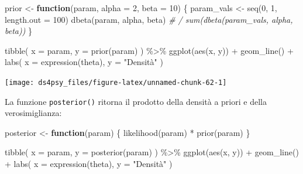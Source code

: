 \documentclass[
  11pt,
]{krantz}
\makeatletter
\newenvironment{Shaded}{\begin{snugshade}}{\end{snugshade}}
\newcommand{\AttributeTok}[1]{\textcolor[rgb]{0.61,0.61,0.61}{#1}}
\newcommand{\CommentTok}[1]{\textcolor[rgb]{0.37,0.37,0.37}{\textit{#1}}}
\newcommand{\ControlFlowTok}[1]{\textcolor[rgb]{0.27,0.27,0.27}{\textbf{#1}}}
\newcommand{\DecValTok}[1]{\textcolor[rgb]{0.06,0.06,0.06}{#1}}
\newcommand{\FunctionTok}[1]{\textcolor[rgb]{0,0,0}{#1}}
\newcommand{\NormalTok}[1]{#1}
\newcommand{\OtherTok}[1]{\textcolor[rgb]{0.37,0.37,0.37}{#1}}
\newcommand{\SpecialCharTok}[1]{\textcolor[rgb]{0,0,0}{#1}}
\newcommand{\StringTok}[1]{\textcolor[rgb]{0.5,0.5,0.5}{#1}}
\newenvironment{kframe}{%
\medskip{}
\setlength{\fboxsep}{.8em}
 \def\at@end@of@kframe{}%
 \ifinner\ifhmode%
  \def\at@end@of@kframe{\end{minipage}}%
  \begin{minipage}{\columnwidth}%
 \fi\fi%
 \def\FrameCommand##1{\hskip\@totalleftmargin \hskip-\fboxsep
 \colorbox{shadecolor}{##1}\hskip-\fboxsep
     \hskip-\linewidth \hskip-\@totalleftmargin \hskip\columnwidth}%
 \MakeFramed {\advance\hsize-\width
   \@totalleftmargin\z@ \linewidth\hsize
   \@setminipage}}%
 {\par\unskip\endMakeFramed%
 \at@end@of@kframe}
\renewenvironment{Shaded}{\begin{kframe}}{\end{kframe}}
\theoremstyle{definition}
\theoremstyle{definition}
\theoremstyle{definition}
\theoremstyle{definition}
\theoremstyle{remark}
\makeatother
\begin{document}
\begin{Shaded}
\begin{Highlighting}[]
\NormalTok{prior }\OtherTok{\textless{}{-}} \ControlFlowTok{function}\NormalTok{(param, }\AttributeTok{alpha =} \DecValTok{2}\NormalTok{, }\AttributeTok{beta =} \DecValTok{10}\NormalTok{) \{}
\NormalTok{  param\_vals }\OtherTok{\textless{}{-}} \FunctionTok{seq}\NormalTok{(}\DecValTok{0}\NormalTok{, }\DecValTok{1}\NormalTok{, }\AttributeTok{length.out =} \DecValTok{100}\NormalTok{)}
  \FunctionTok{dbeta}\NormalTok{(param, alpha, beta) }\CommentTok{\# / sum(dbeta(param\_vals, alpha, beta))}
\NormalTok{\}}

\FunctionTok{tibble}\NormalTok{(}
  \AttributeTok{x =}\NormalTok{ param, }
  \AttributeTok{y =} \FunctionTok{prior}\NormalTok{(param)}
\NormalTok{) }\SpecialCharTok{\%\textgreater{}\%}
  \FunctionTok{ggplot}\NormalTok{(}\FunctionTok{aes}\NormalTok{(x, y)) }\SpecialCharTok{+}
  \FunctionTok{geom\_line}\NormalTok{() }\SpecialCharTok{+}
  \FunctionTok{labs}\NormalTok{(}
    \AttributeTok{x =} \FunctionTok{expression}\NormalTok{(theta),}
    \AttributeTok{y =} \StringTok{"Densità"}
\NormalTok{  )}
\end{Highlighting}
\end{Shaded}

\begin{center}\texttt{[image: ds4psy\_files/figure-latex/unnamed-chunk-62-1]} \end{center}

La funzione \texttt{posterior()} ritorna il prodotto della densità a priori e della verosimiglianza:

\begin{Shaded}
\begin{Highlighting}[]
\NormalTok{posterior }\OtherTok{\textless{}{-}} \ControlFlowTok{function}\NormalTok{(param) \{}
  \FunctionTok{likelihood}\NormalTok{(param) }\SpecialCharTok{*} \FunctionTok{prior}\NormalTok{(param)}
\NormalTok{\}}

\FunctionTok{tibble}\NormalTok{(}
  \AttributeTok{x =}\NormalTok{ param, }
  \AttributeTok{y =} \FunctionTok{posterior}\NormalTok{(param)}
\NormalTok{) }\SpecialCharTok{\%\textgreater{}\%}
  \FunctionTok{ggplot}\NormalTok{(}\FunctionTok{aes}\NormalTok{(x, y)) }\SpecialCharTok{+}
  \FunctionTok{geom\_line}\NormalTok{() }\SpecialCharTok{+}
  \FunctionTok{labs}\NormalTok{(}
    \AttributeTok{x =} \FunctionTok{expression}\NormalTok{(theta),}
    \AttributeTok{y =} \StringTok{"Densità"}
\NormalTok{  )}
\end{Highlighting}
\end{Shaded}
\end{document}
